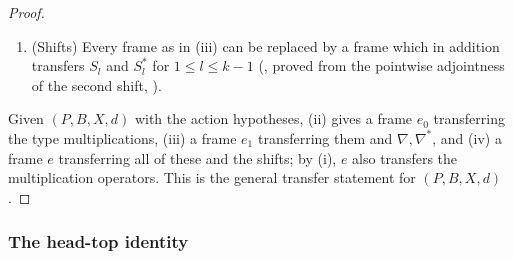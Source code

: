 \begin{proof}
\begin{enumerate}[label=(\roman*)]
), and $\Im\oint_{|w|=R}a_\rho(w)\,dw\in\pi\Z$ for all
$R$ with $R^2>T_T$ (the period condition, ); both
conditions are obtained from the curvature computation in a reference frame
(, where the rotation $K$-invariance is used to control
the trace of the curvature); the reality condition
() relates the coefficients of $\nabla$ and $\nabla^*$,
so that the same phases serve for both ().
The frame $(u_\rho e_\rho)_\rho$ is again a frame, still transfers the type multiplications, and transfers $\nabla,\nabla^*$
().
\item (Shifts) Every frame as in (iii) can be replaced by a frame which in addition transfers $S_l$ and $S_l^*$ for $1\le
l\le k-1$ (, proved from the pointwise
adjointness of the second shift, ).
\end{enumerate}
Given $(P,B,X,d)$ with the action hypotheses, (ii) gives a frame $e_0$ transferring the type multiplications, (iii) a frame
$e_1$ transferring them and $\nabla,\nabla^*$, and (iv) a frame $e$ transferring all of these and the shifts; by (i), $e$ also
transfers the multiplication operators. This is the general transfer statement for $(P,B,X,d)$.
\end{proof}

\subsubsection{The head-top identity}

